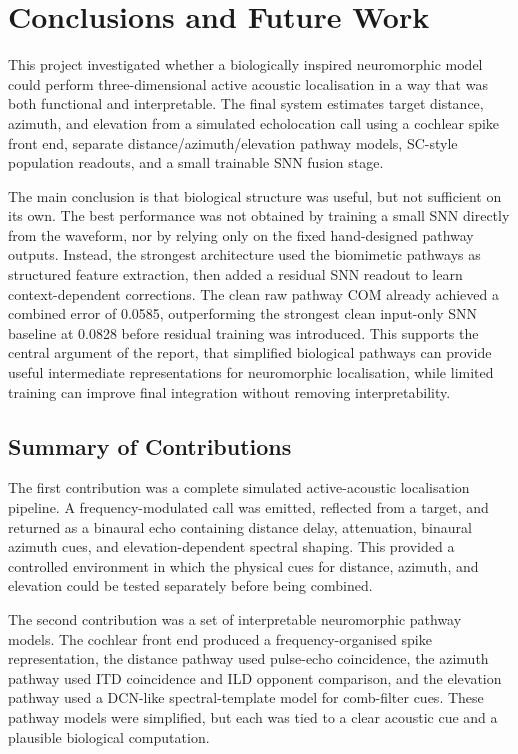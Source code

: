 \chapter{Conclusions and Future Work} \label{ch:conclusions}

This project investigated whether a biologically inspired neuromorphic model could perform three-dimensional active acoustic localisation in a way that was both functional and interpretable. The final system estimates target distance, azimuth, and elevation from a simulated echolocation call using a cochlear spike front end, separate distance/azimuth/elevation pathway models, SC-style population readouts, and a small trainable SNN fusion stage.

The main conclusion is that biological structure was useful, but not sufficient on its own. The best performance was not obtained by training a small SNN directly from the waveform, nor by relying only on the fixed hand-designed pathway outputs. Instead, the strongest architecture used the biomimetic pathways as structured feature extraction, then added a residual SNN readout to learn context-dependent corrections. The clean raw pathway COM already achieved a combined error of 0.0585, outperforming the strongest clean input-only SNN baseline at 0.0828 before residual training was introduced. This supports the central argument of the report, that simplified biological pathways can provide useful intermediate representations for neuromorphic localisation, while limited training can improve final integration without removing interpretability.

\section{Summary of Contributions}

The first contribution was a complete simulated active-acoustic localisation pipeline. A frequency-modulated call was emitted, reflected from a target, and returned as a binaural echo containing distance delay, attenuation, binaural azimuth cues, and elevation-dependent spectral shaping. This provided a controlled environment in which the physical cues for distance, azimuth, and elevation could be tested separately before being combined.

The second contribution was a set of interpretable neuromorphic pathway models. The cochlear front end produced a frequency-organised spike representation, the distance pathway used pulse-echo coincidence, the azimuth pathway used ITD coincidence and ILD opponent comparison, and the elevation pathway used a DCN-like spectral-template model for comb-filter cues. These pathway models were simplified, but each was tied to a clear acoustic cue and a plausible biological computation.

